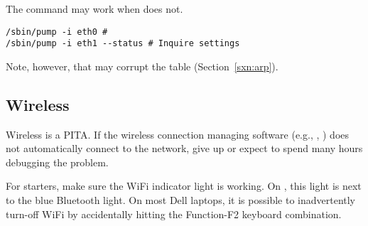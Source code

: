 \documentclass[12pt,twoside]{article}
\begin{document}
The  command may work when  does not.
\begin{verbatim}
/sbin/pump -i eth0 # 
/sbin/pump -i eth1 --status # Inquire settings 
\end{verbatim}
Note, however, that  may corrupt the  table
(Section~\ref{sxn:arp}).

\subsection{Wireless}\label{sxn:wrl}
Wireless is a PITA.
If the wireless connection managing software (e.g., ,
) does not automatically connect to the
network, give up or expect to spend many hours debugging the problem.

For starters, make sure the WiFi indicator light is working.
On , this light is next to the blue Bluetooth light.
On most Dell laptops, it is possible to inadvertently turn-off WiFi 
by accidentally hitting the Function-F2 keyboard combination.
\end{document}
